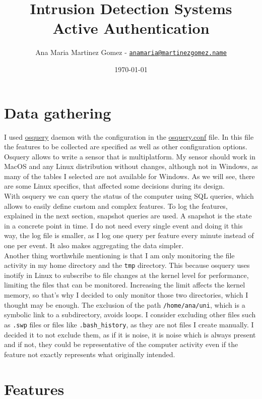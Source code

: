 \documentclass[oneside, 12pt]{article}
\title{Intrusion Detection Systems \\ Active Authentication}
\author{Ana Maria Martinez Gomez - \texttt{\href{mailto:anamaria@martinezgomez.name}{anamaria@martinezgomez.name}}}
\date{\today}
\begin{document}
\maketitle
\clearpage

\section{Data gathering}

I used \href{https://osquery.io}{osquery} daemon with the configuration in the \href{https://github.com/Ana06/are-you-you/blob/master/osquery.conf}{osquery.conf} file.
In this file the features to be collected are specified as well as other configuration options.
Osquery allows to write a sensor that is multiplatform.
My sensor should work in MacOS and any Linux distribution without changes, although not in Windows, as many of the tables I selected are not available for Windows.
As we will see, there are some Linux specifics, that affected some decisions during its design.\\

With osquery we can query the status of the computer using SQL queries, which allows to easily define custom and complex features.
To log the features, explained in the next section, snapshot queries are used.
A snapshot is the state in a concrete point in time.
I do not need every single event and doing it this way, the log file is smaller, as I log one query per feature every minute instead of one per event.
It also makes aggregating the data simpler.\\

Another thing worthwhile mentioning is that I am only monitoring the file activity in my home directory and the \texttt{tmp} directory.
This because osquery uses inotify in Linux to subscribe to file changes at the kernel level for performance, limiting the files that can be monitored.
Increasing the limit affects the kernel memory, so that's why I decided to only monitor those two directories, which I thought may be enough.
The exclusion of the path \texttt{/home/ana/uni}, which is a symbolic link to a subdirectory, avoids loops.
I consider excluding other files such as \texttt{.swp} files or files like \texttt{.bash\_history}, as they are not files I create manually.
I decided it to not exclude them, as if it is noise, it is noise which is always present and if not, they could be representative of the computer activity even if the feature not exactly represents what originally intended.

\section{Features}
\end{document}
